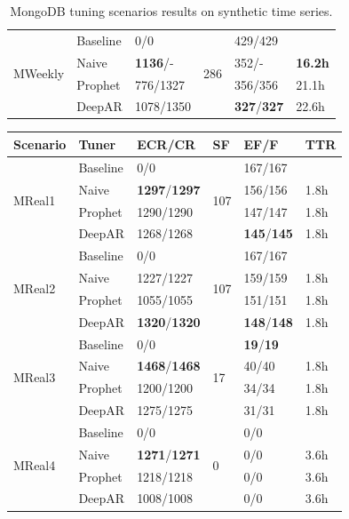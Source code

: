 \documentclass[a4paper, 12pt]{article} %
\newcommand{\ra}[1]{\renewcommand{\arraystretch}{#1}}
\begin{document}
\begin{table}
\begin{tabularx}{\textwidth}{@{}XXXXXX@{}}
			\midrule
			\multirow{4}{*}{MWeekly}
			& Baseline & 0/0 & \multirow{4}{*}{286} & 429/429 & \\
			& Naive & \textbf{1136}/- && 352/- & \textbf{16.2h} \\
			& Prophet & 776/1327 && 356/356 & 21.1h\\
			& DeepAR & 1078/1350 && \textbf{327}/\textbf{327} & 22.6h\\
			
			\bottomrule
		\end{tabularx}
		\caption{MongoDB tuning scenarios results on synthetic time series. } \label{table:results_mongo_synthetic}
	\end{table}
	
	\begin{table}\centering 
		\ra{1.3}
		\begin{tabularx}{\textwidth}{@{}XXXXXX@{}}
			\toprule
			Scenario & Tuner & ECR/CR & SF & EF/F & TTR\\
			
			\midrule
			\multirow{4}{*}{MReal1}
			& Baseline & 0/0 & \multirow{4}{*}{107} & 167/167 & \\
			& Naive & \textbf{1297}/\textbf{1297} && 156/156 & 1.8h \\
			& Prophet & 1290/1290 && 147/147 & 1.8h\\
			& DeepAR & 1268/1268 && \textbf{145}/\textbf{145} & 1.8h\\
			
			\midrule
			\multirow{4}{*}{MReal2}
			& Baseline & 0/0 & \multirow{4}{*}{107} & 167/167 & \\
			& Naive & 1227/1227 && 159/159 & 1.8h \\
			& Prophet & 1055/1055 && 151/151 & 1.8h\\
			& DeepAR & \textbf{1320}/\textbf{1320} && \textbf{148}/\textbf{148} & 1.8h\\
			
			\midrule
			\multirow{4}{*}{MReal3}
			& Baseline & 0/0 & \multirow{4}{*}{17} & \textbf{19}/\textbf{19} & \\
			& Naive & \textbf{1468}/\textbf{1468} && 40/40 & 1.8h \\
			& Prophet & 1200/1200 && 34/34 & 1.8h\\
			& DeepAR & 1275/1275 && 31/31 & 1.8h\\
			
			\midrule
			\multirow{4}{*}{MReal4}
			& Baseline & 0/0 & \multirow{4}{*}{0} & 0/0 & \\
			& Naive & \textbf{1271}/\textbf{1271} && 0/0 & 3.6h \\
			& Prophet & 1218/1218 && 0/0 & 3.6h\\
			& DeepAR & 1008/1008 && 0/0 & 3.6h\\
			

\end{tabularx}
\end{table}
\end{document}
